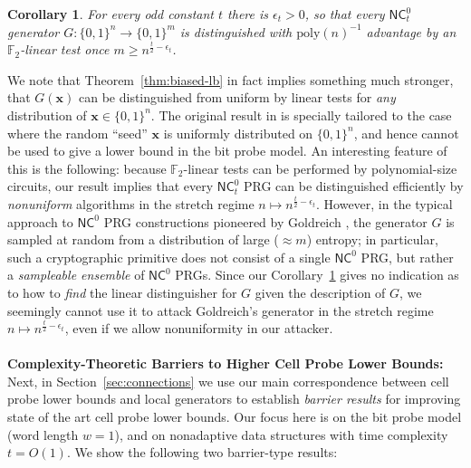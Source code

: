 \documentclass[11pt]{article}
\newtheorem{theorem}{Theorem}
\newtheorem{corollary}{Corollary}
\newcommand{\B}{\{0,1\}}
\newcommand{\poly}{\mathrm{poly}}
\begin{document}
\begin{corollary}
\label{cor:mossel-improvement}
For every odd constant $t$ there is $\epsilon_t>0$, so that every $\mathsf{NC}^0_t$ generator $G: \B^n \to \B^m$ is distinguished with $\poly(n)^{-1}$ advantage by an $\mathbb{F}_2$-linear test once $m \geq n^{\frac{t}{2} - \epsilon_t}$.
\end{corollary}
We note that Theorem~\ref{thm:biased-lb} in fact implies something much stronger, that $G(\bm{x})$ can be distinguished from uniform by linear tests for \emph{any} distribution of $\bm{x} \in \B^n$. The original result in \cite{mossel-epsilon} is specially tailored to the case where the random ``seed'' $\bm{x}$ is uniformly distributed on $\B^n$, and hence cannot be used to give a lower bound in the bit probe model. 
An interesting feature of this is the following: because $\mathbb{F}_2$-linear tests can be performed by polynomial-size circuits, our result implies that every $\mathsf{NC}^0_t$ PRG can be distinguished efficiently by \emph{nonuniform} algorithms in the stretch regime $n \mapsto n^{\frac{t}{2} - \epsilon_t}$. However, in the typical approach to $\mathsf{NC}^0$ PRG constructions pioneered by Goldreich \cite{goldreich-prg}, the generator $G$ is sampled at random from a distribution of large ($\approx m$) entropy; in particular, such a cryptographic primitive does not consist of a single $\mathsf{NC}^0$ PRG, but rather a \emph{sampleable ensemble} of $\mathsf{NC}^0$ PRGs. Since our Corollary~\ref{cor:mossel-improvement} gives no indication as to how to \emph{find} the linear distinguisher for $G$ given the description of $G$, we seemingly cannot use it to attack Goldreich's generator in the stretch regime $n \mapsto n^{\frac{t}{2} - \epsilon_t}$, even if we allow nonuniformity in our attacker.
~\\~\\
{\bf \noindent Complexity-Theoretic Barriers to Higher Cell Probe Lower Bounds:}
Next, in Section~\ref{sec:connections} we use our main correspondence between cell probe lower bounds and local generators to establish \emph{barrier results} for improving state of the art cell probe lower bounds. Our focus here is on the bit probe model (word length $w=1$), and on nonadaptive data structures with time complexity $t =O(1)$. We show the following two barrier-type results:

\end{document}
